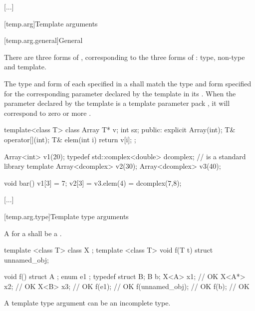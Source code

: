 \documentclass{wg21}
\begin{document}
\textcolor{noteclr}{[...]}


[temp.arg]{Template arguments}

[temp.arg.general]{General}


\begin{removedblock}
\pnum
{}%
There are three forms of
,
corresponding to the three forms of
:
type, non-type and template.
\end{removedblock}

The type and form of each
specified in a
shall match the type and form specified for the corresponding
parameter declared by the template in its
.
When the parameter declared by the template is a template
parameter pack , it will correspond to zero or more
.
\begin{example}
\begin{codeblock}
    template<class T> class Array {
        T* v;
        int sz;
        public:
        explicit Array(int);
        T& operator[](int);
        T& elem(int i) { return v[i]; }
    };

    Array<int> v1(20);
    typedef std::complex<double> dcomplex;  //  is a standard library template
    Array<dcomplex> v2(30);
    Array<dcomplex> v3(40);

    void bar() {
        v1[3] = 7;
        v2[3] = v3.elem(4) = dcomplex(7,8);
    }
\end{codeblock}
\end{example}

\textcolor{noteclr}{[...]}

[temp.arg.type]{Template type arguments}

\pnum
A  for a  shall be a .

\pnum
\begin{example}
    \begin{codeblock}
        template <class T> class X { };
        template <class T> void f(T t) { }
        struct { } unnamed_obj;

        void f() {
            struct A { };
            enum { e1 };
            typedef struct { } B;
            B b;
            X<A> x1;          // OK
            X<A*> x2;         // OK
            X<B> x3;          // OK
            f(e1);            // OK
            f(unnamed_obj);   // OK
            f(b);             // OK
        }
    \end{codeblock}
\end{example}
\begin{note}
A template type argument can be an incomplete type.
\end{note}
\end{document}
